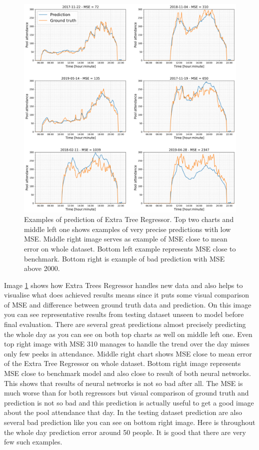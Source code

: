 \documentclass{article}
\begin{document}
\begin{figure}[h!]
\centering
\includegraphics[width=16cm]{imgs/interesting_predictions.png}
\caption{Examples of prediction of Extra Tree Regressor. Top two charts and middle left one shows examples of very precise predictions with low MSE. Middle right image serves as example of MSE close to mean error on whole dataset. Bottom left example represents MSE close to benchmark. Bottom right is example of bad prediction with MSE above 2000.}
\label{fig:new_data}
\end{figure}


Image \ref{fig:new_data} shows how Extra Trees Regressor handles new data and also helps to visualise what does achieved results means since it puts some visual comparison of MSE and difference between ground truth data and prediction. On this image you can see representative results from testing dataset unseen to model before final evaluation. There are several great predictions almost precisely predicting the whole day as you can see on both top charts as well on middle left one. Even top right image with MSE 310 manages to handle the trend over the day misses only few peeks in attendance. Middle right chart shows MSE close to mean error of the Extra Tree Regressor on whole dataset. Bottom right image represents MSE close to benchmark model and also close to result of both neural networks. This shows that results of neural networks is not so bad after all. The MSE is much worse than for both regressors but visual comparison of ground truth and prediction is not so bad and this prediction is actually useful to get a good image about the pool attendance that day. In the testing dataset prediction are also several bad prediction like you can see on bottom right image. Here is throughout the whole day prediction error around 50 people. It is good that there are very few such examples.
\end{document}
